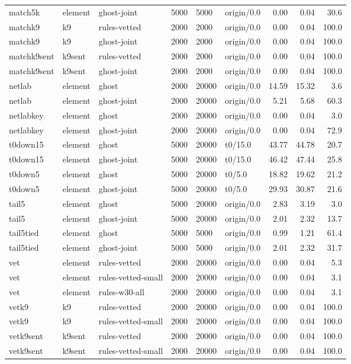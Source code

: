 \begin{table}[!htbp]
\begin{tabular}{@{}llllllrrr@{}}
match5k & element & ghost-joint & 5000 & 5000 & origin/0.0 & 0.00 & 0.04 & 30.6 \\
matchk9 & k9 & rules-vetted & 2000 & 2000 & origin/0.0 & 0.00 & 0.04 & 100.0 \\
matchk9 & k9 & ghost-joint & 2000 & 2000 & origin/0.0 & 0.00 & 0.04 & 100.0 \\
matchk9sent & k9sent & rules-vetted & 2000 & 2000 & origin/0.0 & 0.00 & 0.04 & 100.0 \\
matchk9sent & k9sent & ghost-joint & 2000 & 2000 & origin/0.0 & 0.00 & 0.04 & 100.0 \\
netlab & element & ghost & 2000 & 20000 & origin/0.0 & 14.59 & 15.32 & 3.6 \\
netlab & element & ghost-joint & 2000 & 20000 & origin/0.0 & 5.21 & 5.68 & 60.3 \\
netlabkey & element & ghost & 2000 & 20000 & origin/0.0 & 0.00 & 0.04 & 3.0 \\
netlabkey & element & ghost-joint & 2000 & 20000 & origin/0.0 & 0.00 & 0.04 & 72.9 \\
t0down15 & element & ghost & 5000 & 20000 & t0/15.0 & 43.77 & 44.78 & 20.7 \\
t0down15 & element & ghost-joint & 5000 & 20000 & t0/15.0 & 46.42 & 47.44 & 25.8 \\
t0down5 & element & ghost & 5000 & 20000 & t0/5.0 & 18.82 & 19.62 & 21.2 \\
t0down5 & element & ghost-joint & 5000 & 20000 & t0/5.0 & 29.93 & 30.87 & 21.6 \\
tail5 & element & ghost & 5000 & 20000 & origin/0.0 & 2.83 & 3.19 & 3.0 \\
tail5 & element & ghost-joint & 5000 & 20000 & origin/0.0 & 2.01 & 2.32 & 13.7 \\
tail5tied & element & ghost & 5000 & 5000 & origin/0.0 & 0.99 & 1.21 & 61.4 \\
tail5tied & element & ghost-joint & 5000 & 5000 & origin/0.0 & 2.01 & 2.32 & 31.7 \\
vet & element & rules-vetted & 2000 & 20000 & origin/0.0 & 0.00 & 0.04 & 5.3 \\
vet & element & rules-vetted-small & 2000 & 20000 & origin/0.0 & 0.00 & 0.04 & 3.1 \\
vet & element & rules-w30-all & 2000 & 20000 & origin/0.0 & 0.00 & 0.04 & 3.1 \\
vetk9 & k9 & rules-vetted & 2000 & 20000 & origin/0.0 & 0.00 & 0.04 & 100.0 \\
vetk9 & k9 & rules-vetted-small & 2000 & 20000 & origin/0.0 & 0.00 & 0.04 & 100.0 \\
vetk9sent & k9sent & rules-vetted & 2000 & 20000 & origin/0.0 & 0.00 & 0.04 & 100.0 \\
vetk9sent & k9sent & rules-vetted-small & 2000 & 20000 & origin/0.0 & 0.00 & 0.04 & 100.0 \\
\bottomrule
\end{tabular}
\end{table}

